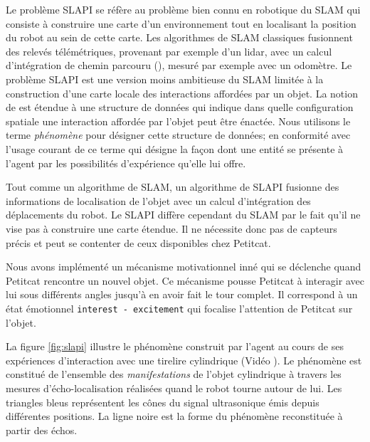Le problème SLAPI se réfère au problème bien connu en robotique du SLAM qui consiste à construire une carte d'un environnement tout en localisant la position du robot au sein de cette carte. 
Les algorithmes de SLAM classiques fusionnent des relevés télémétriques, provenant par exemple d'un lidar, avec un calcul d'intégration de chemin parcouru (), mesuré par exemple avec un odomètre.  
Le problème SLAPI est une version moins ambitieuse du SLAM limitée à la construction d'une carte locale des interactions affordées par un objet.  
La notion de  est étendue à une structure de données qui indique dans quelle configuration spatiale une interaction affordée par l'objet peut être énactée. 
Nous utilisons le terme \emph{phénomène} pour désigner cette structure de données; en conformité avec l'usage courant de ce terme qui désigne la façon dont une entité se présente à l'agent par les possibilités d'expérience qu'elle lui offre. 

Tout comme un algorithme de SLAM, un algorithme de SLAPI fusionne des informations de localisation de l'objet avec un calcul d'intégration des déplacements du robot. 
Le SLAPI diffère cependant du SLAM par le fait qu'il ne vise pas à construire une carte étendue.
Il ne  nécessite donc pas de capteurs précis et peut se contenter de ceux disponibles chez Petitcat.

Nous avons implémenté un mécanisme motivationnel inné qui se déclenche quand Petitcat rencontre un nouvel objet. 
Ce mécanisme pousse Petitcat à interagir avec lui sous différents angles jusqu'à en avoir fait le tour complet. 
Il correspond à un état émotionnel \texttt{interest - excitement} qui focalise l'attention de Petitcat sur l'objet. 


La figure \ref{fig:slapi} illustre le phénomène construit par l'agent au cours de ses expériences d'interaction avec une tirelire cylindrique 
(Vidéo ). 
Le phénomène est constitué de l'ensemble des \emph{manifestations} de l'objet cylindrique à travers les mesures d'écho-localisation réalisées quand le robot tourne autour de lui. 
Les triangles bleus représentent les cônes du signal ultrasonique émis depuis différentes positions. 
La ligne noire est la forme du phénomène reconstituée à partir des échos.

